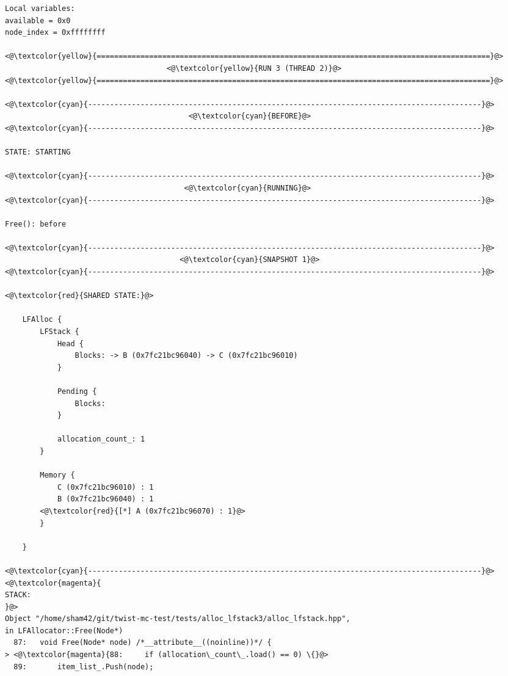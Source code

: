 \begin{adjustwidth}{-3.3cm}{-1cm}
\begin{allintypewriter}
\begin{multicols*}{2}
\begin{lstlisting}[numbers=none]
Local variables: 
available = 0x0
node_index = 0xffffffff

<@\textcolor{yellow}{==========================================================================================}@>
                                     <@\textcolor{yellow}{RUN 3 (THREAD 2)}@>
<@\textcolor{yellow}{==========================================================================================}@>

<@\textcolor{cyan}{------------------------------------------------------------------------------------------}@>
                                          <@\textcolor{cyan}{BEFORE}@>
<@\textcolor{cyan}{------------------------------------------------------------------------------------------}@>

STATE: STARTING

<@\textcolor{cyan}{------------------------------------------------------------------------------------------}@>
                                         <@\textcolor{cyan}{RUNNING}@>
<@\textcolor{cyan}{------------------------------------------------------------------------------------------}@>

Free(): before

<@\textcolor{cyan}{------------------------------------------------------------------------------------------}@>
                                        <@\textcolor{cyan}{SNAPSHOT 1}@>
<@\textcolor{cyan}{------------------------------------------------------------------------------------------}@>

<@\textcolor{red}{SHARED STATE:}@>

    LFAlloc {
	    LFStack {
		    Head {
			    Blocks: -> B (0x7fc21bc96040) -> C (0x7fc21bc96010) 
		    }

		    Pending {
			    Blocks: 
		    }

		    allocation_count_: 1
	    }

	    Memory {
		    C (0x7fc21bc96010) : 1
		    B (0x7fc21bc96040) : 1
		<@\textcolor{red}{[*] A (0x7fc21bc96070) : 1}@>
	    }

    }

<@\textcolor{cyan}{------------------------------------------------------------------------------------------}@>
<@\textcolor{magenta}{
STACK:
}@>
Object "/home/sham42/git/twist-mc-test/tests/alloc_lfstack3/alloc_lfstack.hpp",
in LFAllocator::Free(Node*)
  87:   void Free(Node* node) /*__attribute__((noinline))*/ {
> <@\textcolor{magenta}{88:     if (allocation\_count\_.load() == 0) \{}@>
  89:       item_list_.Push(node);


\end{lstlisting}
\end{multicols*}
\end{allintypewriter}
\end{adjustwidth}
